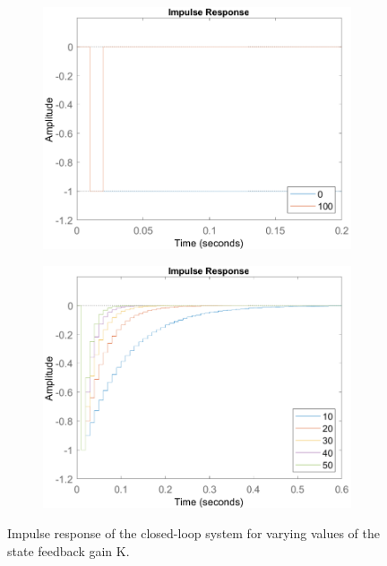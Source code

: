 \documentclass[a4paper,kul]{kulakarticle} %
\begin{document}
\begin{figure}[htp!]
	\centering
	\begin{subfigure}[b]{0.55\textwidth}
		\centering
		\includegraphics[width=\textwidth]{impulse_response1.pdf}
	\end{subfigure}
	
	\begin{subfigure}[b]{0.55\textwidth}  
		\centering 
		\includegraphics[width=\textwidth]{impulse_response3.pdf}
	\end{subfigure}
	\caption{Impulse response of the closed-loop system for varying values of the state feedback gain K.} 
	\label{fig:impulse_response}
\end{figure}
\end{document}
